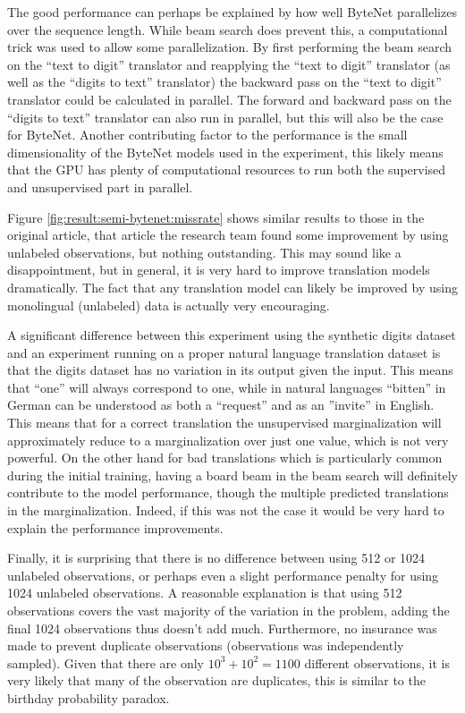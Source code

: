 The good performance can perhaps be explained by how well ByteNet parallelizes over the sequence length. While beam search does prevent this, a computational trick was used to allow some parallelization. By first performing the beam search on the ``text to digit'' translator and reapplying the ``text to digit'' translator (as well as the ``digits to text'' translator) the backward pass on the ``text to digit'' translator could be calculated in parallel. The forward and backward pass on the ``digits to text'' translator can also run in parallel, but this will also be the case for ByteNet. Another contributing factor to the performance is the small dimensionality of the ByteNet models used in the experiment, this likely means that the GPU has plenty of computational resources to run both the supervised and unsupervised part in parallel.

Figure \ref{fig:result:semi-bytenet:missrate} shows similar results to those in the original article, that article the research team found some improvement by using unlabeled observations, but nothing outstanding. This may sound like a disappointment, but in general, it is very hard to improve translation models dramatically. The fact that any translation model can likely be improved by using monolingual (unlabeled) data is actually very encouraging.

A significant difference between this experiment using the synthetic digits dataset and an experiment running on a proper natural language translation dataset is that the digits dataset has no variation in its output given the input. This means that ``one'' will always correspond to one, while in natural languages ``bitten'' in German can be understood as both a ``request'' and as an ''invite'' in English. This means that for a correct translation the unsupervised marginalization will approximately reduce to a marginalization over just one value, which is not very powerful. On the other hand for bad translations which is particularly common during the initial training, having a board beam in the beam search will definitely contribute to the model performance, though the multiple predicted translations in the marginalization. Indeed, if this was not the case it would be very hard to explain the performance improvements. 

Finally, it is surprising that there is no difference between using 512 or 1024 unlabeled observations, or perhaps even a slight performance penalty for using 1024 unlabeled observations. A reasonable explanation is that using 512 observations covers the vast majority of the variation in the problem, adding the final 1024 observations thus doesn't add much. Furthermore, no insurance was made to prevent duplicate observations (observations was independently sampled). Given that there are only $10^3 + 10^2 = 1100$ different observations, it is very likely that many of the observation are duplicates, this is similar to the birthday probability paradox.
